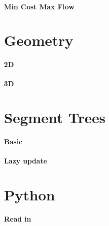 \documentclass[a4paper]{article}
\begin{document}
\paragraph{Min Cost Max Flow} \hfill

\section{Geometry}
\paragraph{2D} \hfill

\paragraph{3D} \hfill

\section{Segment Trees}
\paragraph{Basic} \hfill

\paragraph{Lazy update} \hfill

\section{Python}
\paragraph{Read in} \hfill

\end{document}
